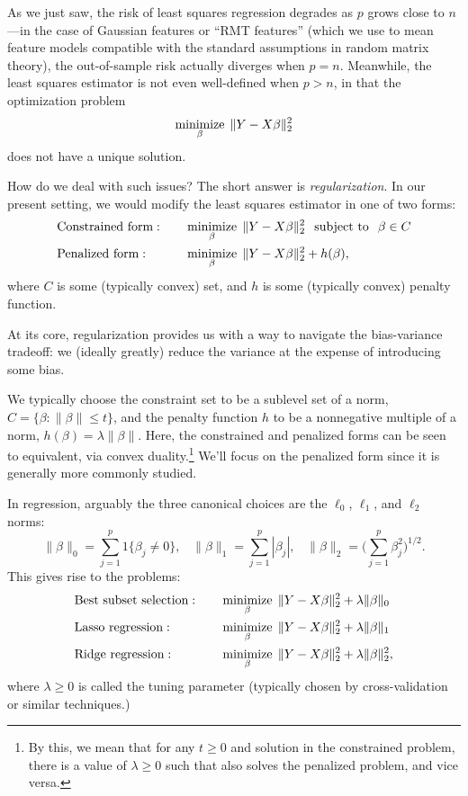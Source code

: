 \documentclass{article}
\begin{document}
As we just saw, the risk of least squares regression degrades as $p$ grows close
to $n$---in the case of Gaussian features or ``RMT features'' (which we use to
mean feature models compatible with the standard assumptions in random matrix
theory), the out-of-sample risk actually diverges when $p = n$. Meanwhile, the 
least squares estimator is not even well-defined when $p > n$, in that the
optimization problem  
\[
\mathop{\mathrm{minimize}}_\beta \; \|Y - X\beta\|_2^2 
\] 
does not have a unique solution.  

How do we deal with such issues? The short answer is \emph{regularization}. In
our present setting, we would modify the least squares estimator in one of two
forms: 
\begin{alignat*}{3}
&\text{Constrained form}: \quad 
&&\mathop{\mathrm{minimize}}_\beta \; \|Y - X\beta\|_2^2 \;\; \mathop{\mathrm{subject\,\,to}} \;\; \beta \in C \\
&\text{Penalized form}: \quad 
&&\mathop{\mathrm{minimize}}_\beta \; \|Y - X\beta\|_2^2 + h(\beta),
\end{alignat*}
where $C$ is some (typically convex) set, and $h$ is some (typically convex)
penalty function.

At its core, regularization provides us with a way to navigate the
bias-variance tradeoff: we (ideally greatly) reduce the variance at the expense
of introducing some bias. 

We typically choose the constraint set to be a sublevel set of a norm, $C =
\{\beta : \|\beta\| \leq t\}$, and the penalty function $h$ to be a nonnegative
multiple of a norm, $h(\beta) = \lambda \|\beta\|$. Here, the constrained and
penalized forms can be seen to equivalent, via convex duality.\footnote{By this,
  we mean that for any $t \geq 0$ and solution \smash{$\hbeta$} in the
  constrained problem, there is a value of $\lambda \geq 0$ such that
  \smash{$\hbeta$} also solves the penalized problem, and vice versa.} 
We'll focus on the penalized form since it is generally more commonly studied.  

In regression, arguably the three canonical choices are the $\ell_0$, $\ell_1$,
and $\ell_2$ norms: 
\[
\|\beta\|_0 = \sum_{j=1}^p 1\{\beta_j \not= 0\}, \;\;\;
\|\beta\|_1 = \sum_{j=1}^p |\beta_j|, \;\;\;
\|\beta\|_2 = \bigg(\sum_{j=1}^p \beta_j^2 \bigg)^{1/2}.
\]
This gives rise to the problems: 
\begin{alignat}{3}
\label{eq:subset}
&\text{Best subset selection}: \quad
&&\mathop{\mathrm{minimize}}_\beta \; \|Y - X\beta\|_2^2 + \lambda \|\beta\|_0 \\ 
\label{eq:lasso}
&\text{Lasso regression}: \quad
&&\mathop{\mathrm{minimize}}_\beta \; \|Y - X\beta\|_2^2 + \lambda \|\beta\|_1 \\ 
\label{eq:ridge} 
&\text{Ridge regression}: \quad
&&\mathop{\mathrm{minimize}}_\beta \; \|Y - X\beta\|_2^2 + \lambda \|\beta\|_2^2,
\end{alignat}
where $\lambda \geq 0$ is called the tuning parameter (typically chosen by
cross-validation or similar techniques.)  
\end{document}
